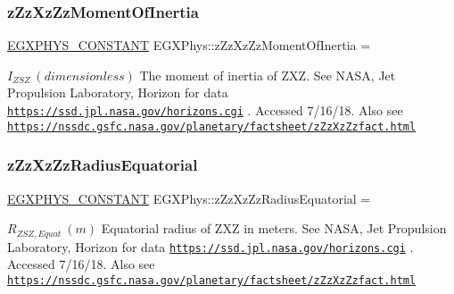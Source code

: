 \subsubsection{\texorpdfstring{z\+Zz\+Xz\+Zz\+Moment\+Of\+Inertia}{zZzXzZzMomentOfInertia}}
{\footnotesize\ttfamily \mbox{\hyperlink{group___e_g_x_phys-_constants-_macros_ga76980d288494ce1714c9ac68a95ba702}{E\+G\+X\+P\+H\+Y\+S\+\_\+\+C\+O\+N\+S\+T\+A\+NT}} E\+G\+X\+Phys\+::z\+Zz\+Xz\+Zz\+Moment\+Of\+Inertia =}

$ I_{ZSZ} \ (dimensionless)$ The moment of inertia of Z\+XZ. See N\+A\+SA, Jet Propulsion Laboratory, Horizon for data \href{https://ssd.jpl.nasa.gov/horizons.cgi}{\tt https\+://ssd.\+jpl.\+nasa.\+gov/horizons.\+cgi} . Accessed 7/16/18. Also see \href{https://nssdc.gsfc.nasa.gov/planetary/factsheet/zZzXzZzfact.html}{\tt https\+://nssdc.\+gsfc.\+nasa.\+gov/planetary/factsheet/z\+Zz\+Xz\+Zzfact.\+html} \mbox{\label{group___e_g_x_phys-_constants-_astrophysics-_solar_system-_z_x_z-_bulk_ga3e41c59433f5c8418f0c23ea82326306}} 
\subsubsection{\texorpdfstring{z\+Zz\+Xz\+Zz\+Radius\+Equatorial}{zZzXzZzRadiusEquatorial}}
{\footnotesize\ttfamily \mbox{\hyperlink{group___e_g_x_phys-_constants-_macros_ga76980d288494ce1714c9ac68a95ba702}{E\+G\+X\+P\+H\+Y\+S\+\_\+\+C\+O\+N\+S\+T\+A\+NT}} E\+G\+X\+Phys\+::z\+Zz\+Xz\+Zz\+Radius\+Equatorial =}

$R_{ZSZ,Equat} \ (m)$ Equatorial radius of Z\+XZ in meters. See N\+A\+SA, Jet Propulsion Laboratory, Horizon for data \href{https://ssd.jpl.nasa.gov/horizons.cgi}{\tt https\+://ssd.\+jpl.\+nasa.\+gov/horizons.\+cgi} . Accessed 7/16/18. Also see \href{https://nssdc.gsfc.nasa.gov/planetary/factsheet/zZzXzZzfact.html}{\tt https\+://nssdc.\+gsfc.\+nasa.\+gov/planetary/factsheet/z\+Zz\+Xz\+Zzfact.\+html} \mbox{\label{group___e_g_x_phys-_constants-_astrophysics-_solar_system-_z_x_z-_bulk_ga9b40c183940d2b9b9c0905edbdc3ed25}} 
